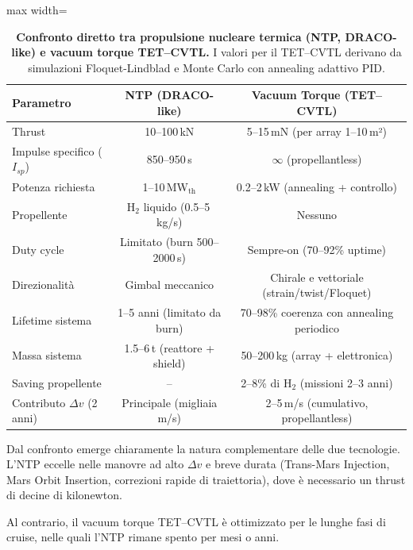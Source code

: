 \documentclass[11pt,a4paper]{article}
\theoremstyle{plain}
\theoremstyle{definition}
\begin{document}
\begin{table}[H]
\centering
\begin{adjustbox}{max width=\textwidth}
\small
{}
\begin{tabular}{lcc}
\toprule
\rowcolor{cyan!12}
\textbf{Parametro} & 
\textbf{NTP (DRACO-like)} & 
\textbf{Vacuum Torque (TET--CVTL)} \\
\midrule
Thrust & 10--100\,kN & 5--15\,mN (per array 1--10\,m²) \\
Impulse specifico (\(I_{sp}\)) & 850--950\,s & \(\infty\) (propellantless) \\
Potenza richiesta & 1--10\,MW$_{\text{th}}$ & 0.2--2\,kW (annealing + controllo) \\
Propellente & H$_2$ liquido (0.5--5\,kg/s) & Nessuno \\
Duty cycle & Limitato (burn 500--2000\,s) & Sempre-on (70--92\% uptime) \\
Direzionalità & Gimbal meccanico & Chirale e vettoriale (strain/twist/Floquet) \\
Lifetime sistema & 1--5 anni (limitato da burn) & 70--98\% coerenza con annealing periodico \\
Massa sistema & 1.5--6\,t (reattore + shield) & 50--200\,kg (array + elettronica) \\
Saving propellente & -- & 2--8\% di H$_2$ (missioni 2--3 anni) \\
Contributo \(\Delta v\) (2 anni) & Principale (migliaia m/s) & 2--5\,m/s (cumulativo, propellantless) \\
\bottomrule
\end{tabular}
\end{adjustbox}
\caption{\textbf{Confronto diretto tra propulsione nucleare termica (NTP, DRACO-like) e vacuum torque TET--CVTL.} 
I valori per il TET--CVTL derivano da simulazioni Floquet-Lindblad e Monte Carlo con annealing adattivo PID.}
\label{tab:ntp_vs_vacuum}
\end{table}

Dal confronto emerge chiaramente la natura complementare delle due tecnologie. L’NTP eccelle nelle manovre ad alto $\Delta v$ e breve durata (Trans-Mars Injection, Mars Orbit Insertion, correzioni rapide di traiettoria), dove è necessario un thrust di decine di kilonewton. 


\vspace{0.2cm}



Al contrario, il vacuum torque TET--CVTL è ottimizzato per le lunghe fasi di cruise, nelle quali l’NTP rimane spento per mesi o anni.
\end{document}
